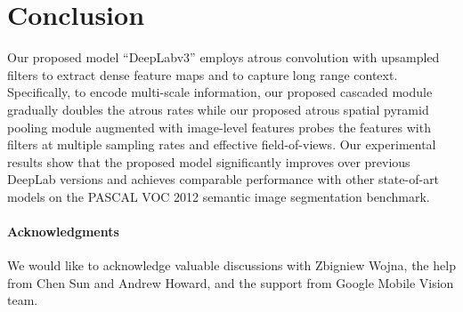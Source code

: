 \section{Conclusion}
Our proposed model ``DeepLabv3'' employs atrous convolution with upsampled filters to extract dense feature maps and to capture long range context. Specifically, to encode multi-scale information, our proposed cascaded module gradually doubles the atrous rates while our proposed atrous spatial pyramid pooling module augmented with image-level features probes the features with filters at multiple sampling rates and effective field-of-views. Our experimental results show that the proposed model significantly improves over previous DeepLab versions and achieves comparable performance with other state-of-art models on the PASCAL VOC 2012 semantic image segmentation benchmark.

\ifcvprfinal
\paragraph{Acknowledgments}
We would like to acknowledge valuable discussions with Zbigniew Wojna, the help from Chen Sun and Andrew Howard, and the support from Google Mobile Vision team.
\fi

